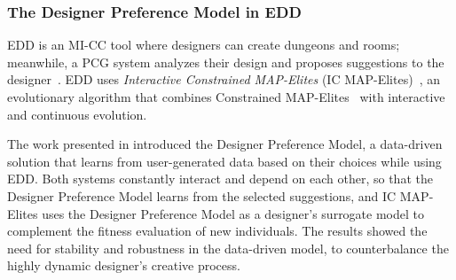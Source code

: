 




\subsubsection{The Designer Preference Model in EDD}

EDD is an MI-CC tool where designers can create dungeons and rooms; meanwhile, a PCG system analyzes their design and proposes suggestions to the designer~\cite{p10Alvarez2018, Baldwin2017}. EDD uses \emph{Interactive Constrained MAP-Elites} (IC MAP-Elites)~\cite{p10alvarez2019empowering}, an evolutionary algorithm that combines Constrained MAP-Elites~\cite{p10Khalifa2018} with interactive and continuous evolution. 

The work presented in \cite{p10Alvarez2020-DesignerPreference} introduced the Designer Preference Model, a data-driven solution that learns from user-generated data based on their choices while using EDD. Both systems constantly interact and depend on each other, so that the Designer Preference Model learns from the selected suggestions, and IC MAP-Elites uses the Designer Preference Model as a designer's surrogate model to complement the fitness evaluation of new individuals. The results showed the need for stability and robustness in the data-driven model, to counterbalance the highly dynamic designer's creative process.  

